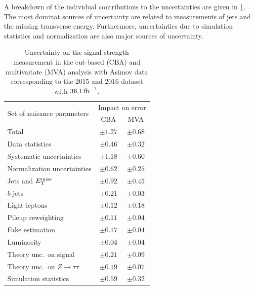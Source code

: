 A breakdown of the individual contributions to the uncertainties are given in \cref{tab:fit:result:uncert}.
The most dominat sources of uncertainty are related to measurements of jets and the missing transverse energy.
Furthermore, uncertainties due to simulation statistics and normalization are also major sources of uncertainty.

\begin{table}[htpb]
    \centering
    \caption{Uncertainty on the signal strength measurement in the cut-based (CBA) and multivariate (MVA) analysis
             with Asimov data corresponding to the 2015 and 2016 dataset with $\SI{36.1}{\invfb}$.}\label{tab:fit:result:uncert}
    \begin{tabular}{lcc}
        \toprule
         \multirow{2}{*}{Set of nuisance parameters} & \multicolumn{2}{c}{Impact on error}  \\
                                        & CBA        & MVA        \\ \midrule
         Total                          & $\pm 1.27$ & $\pm 0.68$ \\
         Data statistics                & $\pm 0.46$ & $\pm 0.32$ \\
         Systematic uncertainties       & $\pm 1.18$ & $\pm 0.60$ \\ \cmidrule{1-3}
         Normalization uncertainties    & $\pm 0.62$ & $\pm 0.25$ \\
         Jets and $E_\text{T}^\text{miss}$             & $\pm 0.92$ & $\pm 0.45$ \\
         $b$-jets                       & $\pm 0.21$ & $\pm 0.03$ \\
         Light leptons                  & $\pm 0.12$ & $\pm 0.18$ \\
         Pileup reweighting             & $\pm 0.11$ & $\pm 0.04$ \\
         Fake estimation                & $\pm 0.17$ & $\pm 0.04$ \\
         Luminosity                     & $\pm 0.04$ & $\pm 0.04$ \\
         Theory unc.\ on signal         & $\pm 0.21$ & $\pm 0.09$ \\
         Theory unc.\ on $Z\to\tau\tau$ & $\pm 0.19$ & $\pm 0.07$ \\
         Simulation statistics          & $\pm 0.59$ & $\pm 0.32$ \\
         \bottomrule
    \end{tabular}
\end{table}
